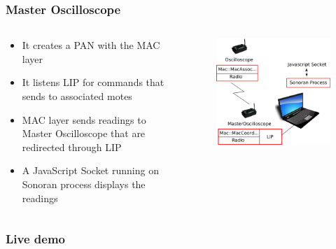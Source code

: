 \begin{frame}[fragile]
 \frametitle{Master Oscilloscope}
 \begin{columns}
    \begin{column}{.58\linewidth}
      \begin{itemize}
	\item It creates a PAN with the MAC layer
	\item It listens LIP for commands that sends to associated motes
	\item MAC layer sends readings to Master Oscilloscope that are redirected through LIP 
	\item A JavaScript Socket running on Sonoran process displays the readings
      \end{itemize}
  \end{column}
  \hfill
    \begin{column}{.4\linewidth}
      \begin{figure}
	\includegraphics[width=\textwidth]{img/oscilloscope.png}
      \end{figure}
    \end{column}
  \end{columns}
\end{frame}

\begin{frame}[fragile]
	\frametitle{Live demo}
\end{frame}